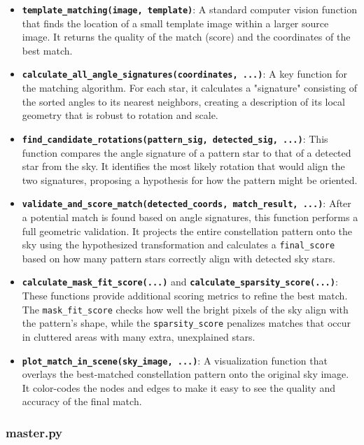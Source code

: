 \documentclass[a4paper,11pt]{article}
\begin{document}
\begin{itemize}
	\item \textbf{\texttt{template\_matching(image, template)}}: A standard computer vision function that finds the location of a small template image within a larger source image. It returns the quality of the match (score) and the coordinates of the best match.
	\item \textbf{\texttt{calculate\_all\_angle\_signatures(coordinates, ...)}}: A key function for the matching algorithm. For each star, it calculates a "signature" consisting of the sorted angles to its nearest neighbors, creating a description of its local geometry that is robust to rotation and scale.
	\item \textbf{\texttt{find\_candidate\_rotations(pattern\_sig, detected\_sig, ...)}}: This function compares the angle signature of a pattern star to that of a detected star from the sky. It identifies the most likely rotation that would align the two signatures, proposing a hypothesis for how the pattern might be oriented.
	\item \textbf{\texttt{validate\_and\_score\_match(detected\_coords, match\_result, ...)}}: After a potential match is found based on angle signatures, this function performs a full geometric validation. It projects the entire constellation pattern onto the sky using the hypothesized transformation and calculates a \texttt{final\_score} based on how many pattern stars correctly align with detected sky stars.
	\item \textbf{\texttt{calculate\_mask\_fit\_score(...)}} and \textbf{\texttt{calculate\_sparsity\_score(...)}}: These functions provide additional scoring metrics to refine the best match. The \texttt{mask\_fit\_score} checks how well the bright pixels of the sky align with the pattern's shape, while the \texttt{sparsity\_score} penalizes matches that occur in cluttered areas with many extra, unexplained stars.
	\item \textbf{\texttt{plot\_match\_in\_scene(sky\_image, ...)}}: A visualization function that overlays the best-matched constellation pattern onto the original sky image. It color-codes the nodes and edges to make it easy to see the quality and accuracy of the final match.
\end{itemize}

\subsubsection*{master.py}
\hrulefill
\end{document}
